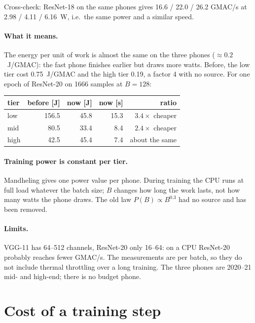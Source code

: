 \documentclass[11pt,a4paper]{article}
\begin{document}
Cross-check: ResNet-18 on the same phones gives 16.6 / 22.0 / 26.2 GMAC/s at
2.98 / 4.11 / 6.16~W, i.e.\ the same power and a similar speed.

\paragraph{What it means.} The energy per unit of work is almost the same on
the three phones ($\approx 0.2$~J/GMAC): the fast phone finishes earlier but
draws more watts. Before, the low tier cost 0.75~J/GMAC and the high tier
0.19, a factor 4 with no source. For one epoch of ResNet-20 on 1666 samples
at $B=128$:

\begin{center}
\begin{tabular}{lrrrr}
\toprule
tier & before [J] & now [J] & now [s] & ratio \\
\midrule
low  & 156.5 & 45.8 & 15.3 & $3.4\times$ cheaper \\
mid  &  80.5 & 33.4 &  8.4 & $2.4\times$ cheaper \\
high &  42.5 & 45.4 &  7.4 & about the same \\
\bottomrule
\end{tabular}
\end{center}

\paragraph{Training power is constant per tier.} Mandheling gives one power
value per phone. During training the CPU runs at full load whatever the batch
size; $B$ changes how long the work lasts, not how many watts the phone draws.
The old law $P(B)\propto B^{0.3}$ had no source and has been removed.

\paragraph{Limits.} VGG-11 has 64--512 channels, ResNet-20 only 16--64: on a
CPU ResNet-20 probably reaches fewer GMAC/s. The measurements are per batch,
so they do not include thermal throttling over a long training. The three
phones are 2020--21 mid- and high-end; there is no budget phone.

\section{Cost of a training step}
\end{document}
